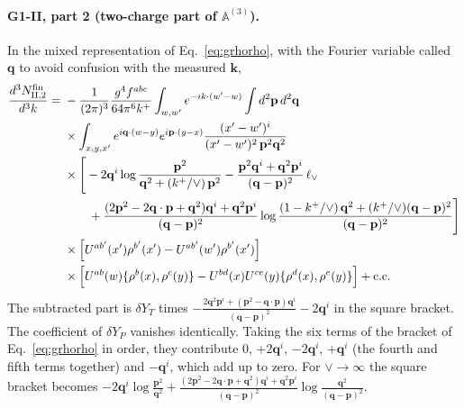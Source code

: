 \documentclass[aps,prd,onecolumn,superscriptaddress,nofootinbib,floatfix,longbibliography,11pt]{revtex4-2}
\numberwithin{equation}{section}
\def\mf#1{\mathbb{#1}}
\newcommand{\lV}{\ell_{\vee}}
\begin{document}
\paragraph*{G1-II, part 2 (two-charge part of $\mf A^{(3)}$).} In the mixed representation of Eq.~\eqref{eq:grhorho}, with the Fourier variable called $\mathbf q$ to avoid confusion with the measured $\mathbf k$,
\begin{align}
\frac{d^3N^{\rm fin}_{\rm II,2}}{d^3k}={}&-\frac{1}{(2\pi)^3}\frac{g^4f^{abc}}{64\pi^6k^+}\int_{w,w'}e^{-ik\cdot(w'-w)}\int d^2\mathbf p\,d^2\mathbf q\notag\\
&\times\int_{x,y,x'}e^{i\mathbf q\cdot(w-y)}e^{i\mathbf p\cdot(y-x)}\frac{(x'-w')^i}{(x'-w')^2\,\mathbf p^2\mathbf q^2}\notag\\
&\times\Bigg[-2\mathbf q^i\log\frac{\mathbf p^2}{\mathbf q^2+(k^+/\vee)\,\mathbf p^2}-\frac{\mathbf p^2\mathbf q^i+\mathbf q^2\mathbf p^i}{(\mathbf q-\mathbf p)^2}\,\lV\notag\\
&\qquad+\frac{(2\mathbf p^2-2\mathbf q\cdot\mathbf p+\mathbf q^2)\mathbf q^i+\mathbf q^2\mathbf p^i}{(\mathbf q-\mathbf p)^2}\log\frac{(1-k^+/\vee)\,\mathbf q^2+(k^+/\vee)(\mathbf q-\mathbf p)^2}{(\mathbf q-\mathbf p)^2}\Bigg]\notag\\
&\times\Big[U^{ab'}(x')\rho^{b'}(x')-U^{ab'}(w')\rho^{b'}(x')\Big]\notag\\
&\times\Big[U^{ab}(w)\{\rho^b(x),\rho^c(y)\}-U^{bd}(x)U^{ce}(y)\{\rho^d(x),\rho^e(y)\}\Big]+{\rm c.c.}
\label{eq:finII2}
\end{align}
The subtracted part is $\delta Y_T$ times $-\frac{2\mathbf q^2\mathbf p^i+(\mathbf p^2-\mathbf q\cdot\mathbf p)\mathbf q^i}{(\mathbf q-\mathbf p)^2}-2\mathbf q^i$ in the square bracket. The coefficient of $\delta Y_P$ vanishes identically. Taking the six terms of the bracket of Eq.~\eqref{eq:grhorho} in order, they contribute $0$, $+2\mathbf q^i$, $-2\mathbf q^i$, $+\mathbf q^i$ (the fourth and fifth terms together) and $-\mathbf q^i$, which add up to zero. For $\vee\to\infty$ the square bracket becomes $-2\mathbf q^i\log\frac{\mathbf p^2}{\mathbf q^2}+\frac{(2\mathbf p^2-2\mathbf q\cdot\mathbf p+\mathbf q^2)\mathbf q^i+\mathbf q^2\mathbf p^i}{(\mathbf q-\mathbf p)^2}\log\frac{\mathbf q^2}{(\mathbf q-\mathbf p)^2}$.
\end{document}
